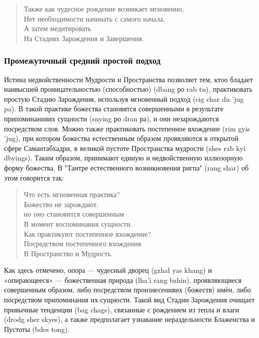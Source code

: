 \begin{verse}
Также как чудесное рождение возникает мгновенно,\\
Нет необходимости начинать с самого начала,\\
А затем медитировать\\
На Стадиях Зарождения и Завершения.\\
\end{verse}

\subsubsection{Промежуточный средний простой подход}

Истина недвойственности Мудрости и Пространства позволяет тем, ктоо бладает
наивысшей проницательностью (способностью) (dbang ро rab tu), практиковать простую
Стадию Зарождения, используя мгновенный подход (cig char du 'jug pa). В такой практике
божества становятся совершенными в результате припоминанияих сущности (snying ро dran
ра), и они незарождаются посредством слов. Можно также практиковать постепенное
вхождение (rim gyis 'jug), при котором божества естественным образом проявляются в
открытой сфере Самантабхадри, в великой пустоте Пространства мудрости (shes rab kyi
dbyings). Таким образом, принимают единую и недвойственную иллюзорную форму
божества. В "Тантре естественного возникновения ригпа" (rang shar) об этом говорится так:

\begin{verse}
Что есть мгновенная практика?\\
Божество не зарождают, \\
\indent но оно становится совершенным\\
В момент воспоминания сущности.\\
Как практикуют постепенное вхождение?\\
Посредством постепенного вхождения\\
В Пространство и Мудрость.\\
\end{verse}

Как здесь отмечено, опора — чудесный дворец (gzhal yas khang) и «опирающееся» —
божественная природа (lha'i rang bzhin), проявляющиеся совершенным
образом, либо посредством произнесенияих (божеств) имён, либо посредством
припоминания их сущности. Такой вид Стадии Зарождения очищает привычные тенденции
(bag chags), связанные с рождением из тепла и влаги (drodg sher skyes), а также
предполагает узнавание нераздельности Блаженства и Пустоты (bdes tong).


